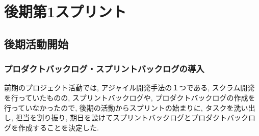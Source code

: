 \section{後期第1スプリント}
\subsection{後期活動開始}
\subsubsection{プロダクトバックログ・スプリントバックログの導入}
前期のプロジェクト活動では, アジャイル開発手法の１つである, スクラム開発を行っていたものの, スプリントバックログや, プロダクトバックログの作成を行っていなかったので,
後期の活動からスプリントの始まりに, タスクを洗い出し, 担当を割り振り, 期日を設けてスプリントバックログとプロダクトバックログを作成することを決定した.

